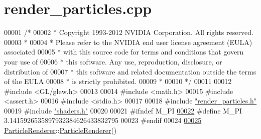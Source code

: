 \hypertarget{render__particles_8cpp_source}{\section{render\-\_\-particles.\-cpp}
}

\begin{DoxyCode}
00001 \textcolor{comment}{/*}
00002 \textcolor{comment}{ * Copyright 1993-2012 NVIDIA Corporation.  All rights reserved.}
00003 \textcolor{comment}{ *}
00004 \textcolor{comment}{ * Please refer to the NVIDIA end user license agreement (EULA) associated}
00005 \textcolor{comment}{ * with this source code for terms and conditions that govern your use of}
00006 \textcolor{comment}{ * this software. Any use, reproduction, disclosure, or distribution of}
00007 \textcolor{comment}{ * this software and related documentation outside the terms of the EULA}
00008 \textcolor{comment}{ * is strictly prohibited.}
00009 \textcolor{comment}{ *}
00010 \textcolor{comment}{ */}
00011 
00012 \textcolor{preprocessor}{#}\textcolor{preprocessor}{include} \textcolor{preprocessor}{<}\textcolor{preprocessor}{GL}\textcolor{preprocessor}{/}\textcolor{preprocessor}{glew}\textcolor{preprocessor}{.}\textcolor{preprocessor}{h}\textcolor{preprocessor}{>}
00013 
00014 \textcolor{preprocessor}{#}\textcolor{preprocessor}{include} \textcolor{preprocessor}{<}\textcolor{preprocessor}{math}\textcolor{preprocessor}{.}\textcolor{preprocessor}{h}\textcolor{preprocessor}{>}
00015 \textcolor{preprocessor}{#}\textcolor{preprocessor}{include} \textcolor{preprocessor}{<}\textcolor{preprocessor}{assert}\textcolor{preprocessor}{.}\textcolor{preprocessor}{h}\textcolor{preprocessor}{>}
00016 \textcolor{preprocessor}{#}\textcolor{preprocessor}{include} \textcolor{preprocessor}{<}\textcolor{preprocessor}{stdio}\textcolor{preprocessor}{.}\textcolor{preprocessor}{h}\textcolor{preprocessor}{>}
00017 
00018 \textcolor{preprocessor}{#}\textcolor{preprocessor}{include} \hyperlink{render__particles_8h}{"render\_particles.h"}
00019 \textcolor{preprocessor}{#}\textcolor{preprocessor}{include} \hyperlink{shaders_8h}{"shaders.h"}
00020 
00021 \textcolor{preprocessor}{#}\textcolor{preprocessor}{ifndef} \textcolor{preprocessor}{M\_PI}
\hypertarget{render__particles_8cpp_source_l00022}{}\hyperlink{render__particles_8cpp_ae71449b1cc6e6250b91f539153a7a0d3}{00022} \textcolor{preprocessor}{#}\textcolor{preprocessor}{define} \textcolor{preprocessor}{M\_PI}    3.1415926535897932384626433832795
00023 \textcolor{preprocessor}{#}\textcolor{preprocessor}{endif}
00024 
\hypertarget{render__particles_8cpp_source_l00025}{}\hyperlink{class_particle_renderer_a1718484686c2e6db488cc88c433d03cc}{00025} \hyperlink{class_particle_renderer}{ParticleRenderer}::\hyperlink{class_particle_renderer_a1718484686c2e6db488cc88c433d03cc}{ParticleRenderer}()

\end{DoxyCode}
